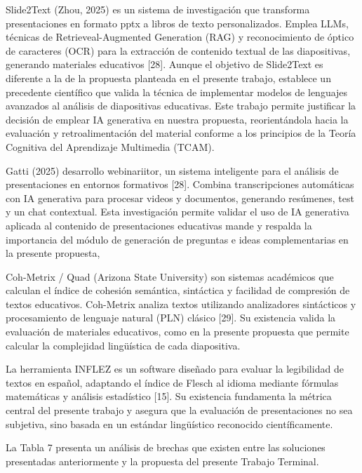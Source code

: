 \documentclass[11pt]{article}
\begin{document}
Slide2Text (Zhou, 2025) es un sistema de investigación que transforma presentaciones en formato pptx a libros de texto personalizados. Emplea LLMs, técnicas de Retrieveal-Augmented Generation (RAG) y reconocimiento de óptico de caracteres (OCR) para la extracción de contenido textual de las diapositivas, generando materiales educativos [28]. Aunque el objetivo de Slide2Text es diferente a la de la propuesta planteada en el presente trabajo, establece un precedente científico que valida la técnica de implementar modelos de lenguajes avanzados al análisis de diapositivas educativas. Este trabajo permite justificar la decisión de emplear IA generativa en nuestra propuesta, reorientándola hacia la evaluación y retroalimentación del material conforme a los principios de la Teoría Cognitiva del Aprendizaje Multimedia (TCAM).

Gatti (2025) desarrollo webinariitor, un sistema inteligente para el análisis de presentaciones en entornos formativos [28]. Combina transcripciones automáticas con IA generativa para procesar videos y documentos, generando resúmenes, test y un chat contextual. Esta investigación permite validar el uso de IA generativa aplicada al contenido de presentaciones educativas
mande y respalda la importancia del módulo de generación de preguntas e ideas complementarias en la presente propuesta,

Coh-Metrix / Quad (Arizona State University) son sistemas académicos que calculan el índice de cohesión semántica, sintáctica y facilidad de compresión de textos educativos. Coh-Metrix analiza textos utilizando analizadores sintácticos y procesamiento de lenguaje natural (PLN) clásico [29]. Su existencia valida la evaluación de materiales educativos, como en la presente propuesta que permite calcular la complejidad lingüística de cada diapositiva.

La herramienta INFLEZ es un software diseñado para evaluar la legibilidad de textos en español, adaptando el índice de Flesch al idioma mediante fórmulas matemáticas y análisis estadístico [15]. Su existencia fundamenta la métrica central del presente trabajo y asegura que la evaluación de presentaciones no sea subjetiva, sino basada en un estándar lingüístico reconocido científicamente.

La Tabla 7 presenta un análisis de brechas que existen entre las soluciones presentadas anteriormente y la propuesta del presente Trabajo Terminal. 
\end{document}
